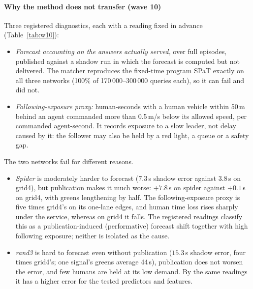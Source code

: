 \paragraph{Why the method does not transfer (wave 10)} Three registered diagnostics, each with a reading fixed in advance
(Table~\ref{tab:w10}):
\begin{itemize}\setlength\itemsep{1pt}
\item \emph{Forecast accounting on the answers actually served,} over full episodes, published against a shadow run in which the forecast
is computed but not delivered. The matcher reproduces the fixed-time program SPaT exactly on all three networks (100\% of 170\,000--300\,000
queries each), so it can fail and did not.
\item \emph{Following-exposure proxy:} human-seconds with a human vehicle within 50\,m behind an agent commanded more than 0.5\,m/s below
its allowed speed, per commanded agent-second. It records exposure to a slow leader, not delay caused by it: the follower may also be held
by a red light, a queue or a safety gap.
\end{itemize}
The two networks fail for different reasons.
\begin{itemize}\setlength\itemsep{1pt}
\item \emph{Spider} is moderately harder to forecast ($7.3$\,s shadow error against $3.8$\,s on grid4), but publication makes it much
worse: $+7.8$\,s on spider against $+0.1$\,s on grid4, with greens lengthening by half. The following-exposure proxy is five times grid4's
on its one-lane edges, and human time loss rises sharply under the service, whereas on grid4 it falls. The registered readings classify
this as a publication-induced (performative) forecast shift together with high following exposure; neither is isolated as the cause.
\item \emph{rand3} is hard to forecast even without publication ($15.3$\,s shadow error, four times grid4's; one signal's greens average
44\,s), publication does not worsen the error, and few humans are held at its low demand. By the same readings it has a higher error for the
tested predictors and features.
\end{itemize}
